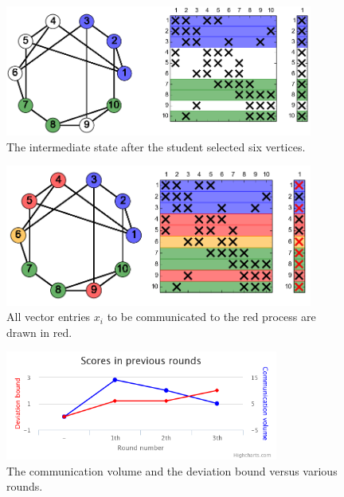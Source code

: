 \documentclass[12pt, oneside]{book}
\begin{document}
\begin{figure}
\centering
\includegraphics[width=0.9\textwidth]{twoColors}
\caption{The intermediate state after the student selected six vertices.}
\label{f.beginning}
\end{figure}

\begin{figure}
\centering
\includegraphics[width=0.9\textwidth]{redComm}
\caption{All vector entries $x_i$ to be communicated to the red process are drawn in red.}
\label{f.communication}
\end{figure}

\begin{figure}
\centering
\includegraphics[width=0.8\textwidth]{chart}
\caption{The communication volume and the deviation bound versus various rounds.}
\label{f.score}
\end{figure}
\end{document}
